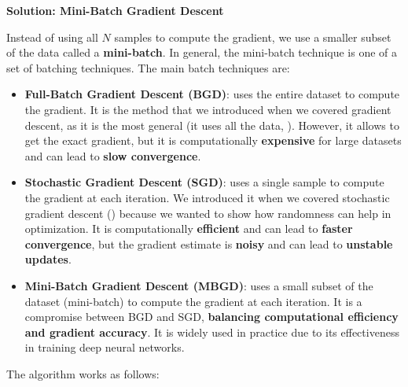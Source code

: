 \newpage

\begin{flushleft}
    \textcolor{Green3}{ \textbf{Solution: Mini-Batch Gradient Descent}}
\end{flushleft}
Instead of using all $N$ samples to compute the gradient, we use a smaller subset of the data called a \textbf{mini-batch}. In general, the mini-batch technique is one of a set of batching techniques. The main batch techniques are:
\begin{itemize}
    \item \textbf{Full-Batch Gradient Descent (BGD)}: uses the entire dataset to compute the gradient. It is the method that we introduced when we covered gradient descent, as it is the most general (it uses all the data, ). However, it allows to get the exact gradient, but it is computationally \textbf{expensive} for large datasets and can lead to \textbf{slow convergence}.

    \item \textbf{Stochastic Gradient Descent (SGD)}: uses a single sample to compute the gradient at each iteration. We introduced it when we covered stochastic gradient descent () because we wanted to show how randomness can help in optimization. It is computationally \textbf{efficient} and can lead to \textbf{faster convergence}, but the gradient estimate is \textbf{noisy} and can lead to \textbf{unstable updates}.
    
    \item \textbf{Mini-Batch Gradient Descent (MBGD)}: uses a small subset of the dataset (mini-batch) to compute the gradient at each iteration. It is a compromise between BGD and SGD, \textbf{balancing computational efficiency and gradient accuracy}. It is widely used in practice due to its effectiveness in training deep neural networks.
\end{itemize}
The  algorithm works as follows:
